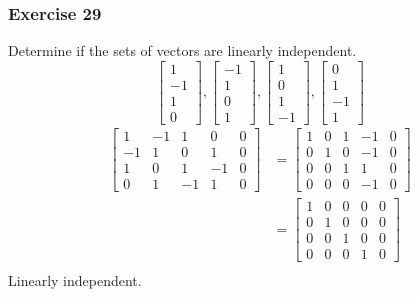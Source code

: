 \documentclass{math}
\begin{document}
\subsubsection*{Exercise 29}
Determine if the sets of vectors are linearly independent.
\[ \begin{bmatrix}1 \\ -1 \\ 1 \\ 0\end{bmatrix},
  \begin{bmatrix}-1 \\ 1 \\ 0 \\ 1\end{bmatrix},
  \begin{bmatrix}1 \\ 0 \\ 1 \\ -1\end{bmatrix},
  \begin{bmatrix}0 \\ 1 \\ -1 \\ 1\end{bmatrix} \]
\begin{align*}
  \begin{bmatrix}
    1 & -1 & 1 & 0 & 0 \\
    -1 & 1 & 0 & 1 & 0 \\
    1 & 0 & 1 & -1 & 0 \\
    0 & 1 & -1 & 1 & 0
  \end{bmatrix} &= \begin{bmatrix}
    1 & 0 & 1 & -1 & 0 \\
    0 & 1 & 0 & -1 & 0 \\
    0 & 0 & 1 & 1 & 0 \\
    0 & 0 & 0 & -1 & 0
  \end{bmatrix} \\
  &= \begin{bmatrix}
    1 & 0 & 0 & 0 & 0 \\
    0 & 1 & 0 & 0 & 0 \\
    0 & 0 & 1 & 0 & 0 \\
    0 & 0 & 0 & 1 & 0
  \end{bmatrix} \\
\end{align*}
Linearly independent.
\end{document}
